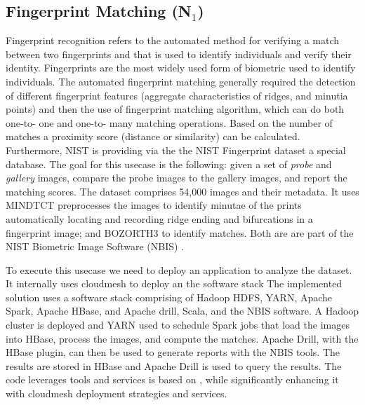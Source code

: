 



\subsection{Fingerprint Matching (N$_1$)}

Fingerprint recognition refers to the automated method for verifying a
match between two fingerprints and that is used to identify
individuals and verify their identity. Fingerprints are the most
widely used form of biometric used to identify individuals. The
automated fingerprint matching generally required the detection of
different fingerprint features (aggregate characteristics of ridges,
and minutia points) and then the use of fingerprint matching
algorithm, which can do both one-to- one and one-to- many matching
operations. Based on the number of matches a proximity score (distance
or similarity) can be calculated. Furthermore, NIST is providing via
the the NIST Fingerprint dataset a special database. The goal for this
usecase is the following: given a set of {\it probe} and {\it gallery}
images, compare the probe images to the gallery images, and report the
matching scores.  The dataset comprises 54,000 images and their
metadata.  It uses MINDTCT \cite{mindtct} preprocesses the images
to identify minutae of the prints automatically locating and recording
ridge ending and bifurcations in a fingerprint image; and BOZORTH3
\cite{garris2001user} to identify matches. Both are are part of the NIST
Biometric Image Software (NBIS) \cite{watson2007user}.

To execute this usecase we need to deploy an application to analyze
the dataset. It internally uses cloudmesh to deploy an the software
stack The implemented \cite{nist-fingerprint} solution uses a software
stack comprising of Hadoop HDFS\cite{hadoop}, YARN\cite{hadoop},
Apache Spark\cite{apache-spark}, Apache HBase\cite{apache-hbase}, and
Apache drill\cite{apache-drill}, Scala\cite{scala-lang}, and the NBIS
software\cite{flanagan2010nist}. A Hadoop cluster is deployed and YARN
used to schedule Spark jobs that load the images into HBase, process
the images, and compute the matches. Apache Drill, with the HBase
plugin, can then be used to generate reports with the NBIS
tools\cite{watson2007user}. The results are stored in HBase and Apache
Drill is used to query the results.  The code leverages tools and
services is based on \cite{nist-bd-pwg}, while significantly enhancing
it with cloudmesh deployment strategies and services.


